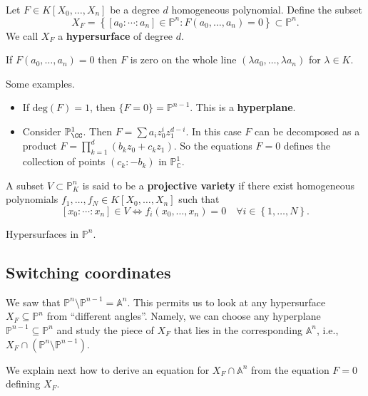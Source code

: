 \documentclass[12pt, a4paper]{article}
\newcommand{\PP}{\mathbb P}
\begin{document}
\begin{definition}
    Let \(F \in K[X_0,\ldots,X_n]\) be a degree \(d\) homogeneous polynomial. Define the subset
    \[X_F = \left\{ [a_0:\cdots:a_n] \in \PP^n :F(a_0,\ldots,a_n)=0 \right\} \subset \PP^n.\]
    We call \(X_F\) a \textbf{hypersurface} of degree \(d\).
\end{definition}

\begin{mdremark}
    If \(F(a_0, \ldots,a_n)=0\) then \(F\) is zero on the whole line \((\lambda a_0,\ldots,\lambda a_n)\) for \(\lambda \in K\). 
\end{mdremark}

\begin{mdexample}
    Some examples.
    \begin{itemize}
        \item If \(\text{deg}(F) = 1\), then \(\{F = 0\} = \mathbb{P}^{n-1}\). This is a \textbf{hyperplane}.
        \item Consider \(\PP^1_{\CC}\). Then \(F = \sum a_i z_0^i z_1^{d-i}\). In this case \(F\) can be decomposed as a product \(F = \prod_{k=1}^d (b_k z_0 + c_k z_1)\). So the equations \(F = 0\) defines the collection of points \((c_k : -b_k)\) in \(\mathbb{P}^1_{\mathbb{C}}\).
    \end{itemize}
\end{mdexample}

\begin{definition}
    A subset \(V \subset \PP^n_K\) is said to be a \textbf{projective variety} if there exist homogeneous polynomials \(f_1,\ldots,f_N \in K[X_0,\ldots,X_n]\) such that 
    \[[x_0:\cdots:x_n] \in V \iff f_i(x_0,\ldots,x_n)=0\quad \forall i\in \left\{ 1,\ldots,N \right\}.\]
\end{definition}

\begin{mdexample}
    Hypersurfaces in \(\PP^n\).
\end{mdexample}

\subsection{Switching coordinates}

\begin{mdnote}
    We saw that \(\mathbb{P}^n \setminus \mathbb{P}^{n-1} = \mathbb{A}^n\). This permits us to look at any hypersurface \(X_F \subseteq \mathbb{P}^n\) from ``different angles''. Namely, we can choose any hyperplane \(\mathbb{P}^{n-1} \subseteq \mathbb{P}^n\) and study the piece of \(X_F\) that lies in the corresponding \(\mathbb{A}^n\), i.e., \(X_F \cap (\mathbb{P}^n \setminus \mathbb{P}^{n-1})\).
    
    We explain next how to derive an equation for \(X_F \cap \mathbb{A}^n\) from the equation \(F=0\) defining \(X_F\).
\end{mdnote}
\end{document}
